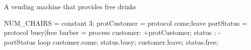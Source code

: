 A vending machine that provides free drinks
\begin{code}
NUM_CHAIRS = constant 3;
protCustomer = protocol {come;leave}
portStatus = protocol {busy|free}
barber = process customer: +protCustomer; status : -portStatus
{
    loop
    {
        customer.come;
        status.busy;
        customer.leave;
        status.free;
    }
}

\end{code}

